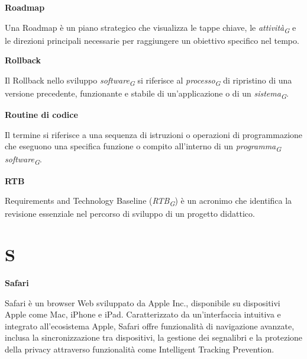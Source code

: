 \documentclass{article}
\begin{document}
\vspace{0.4cm}

\textbf{Roadmap}

\vspace{0.1cm}

Una Roadmap è un piano strategico che visualizza le tappe chiave, le \textit{attività}\textsubscript{\textit{G}} e le direzioni principali necessarie per raggiungere un obiettivo specifico nel tempo.

\vspace{0.4cm}

\textbf{Rollback}

\vspace{0.1cm}

Il Rollback nello sviluppo \textit{software}\textsubscript{\textit{G}} si riferisce al \textit{processo}\textsubscript{\textit{G}} di ripristino di una versione precedente, funzionante e stabile di un'applicazione o di un \textit{sistema}\textsubscript{\textit{G}}.

\vspace{0.4cm}

\textbf{Routine di codice}

\vspace{0.1cm}

Il termine si riferisce a una sequenza di istruzioni o operazioni di programmazione che eseguono una specifica funzione o compito all'interno di un \textit{programma}\textsubscript{\textit{G}} \textit{software}\textsubscript{\textit{G}}.

\pagebreak

\textbf{RTB}

\vspace{0.1cm}

Requirements and Technology Baseline (\textit{RTB}\textsubscript{\textit{G}}) è un acronimo che identifica la revisione essenziale nel percorso di sviluppo di un progetto didattico.

\pagebreak
\section*{S}
{}

\vspace{0.4cm}

\textbf{Safari}

\vspace{0.1cm}

Safari è un browser Web sviluppato da Apple Inc., disponibile su dispositivi Apple come Mac, iPhone e iPad. Caratterizzato da un'interfaccia intuitiva e integrato all'ecosistema Apple, Safari offre funzionalità di navigazione avanzate, inclusa la sincronizzazione tra dispositivi, la gestione dei segnalibri e la protezione della privacy attraverso funzionalità come Intelligent Tracking Prevention. 
\end{document}

